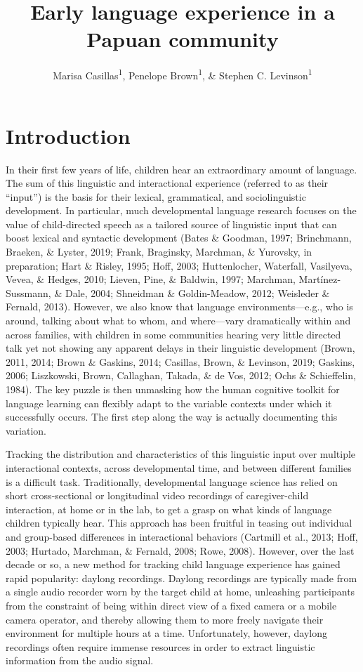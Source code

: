 \documentclass[,man,floatsintext]{apa6}
\title{Early language experience in a Papuan community}
\author{Marisa Casillas\textsuperscript{1}, Penelope Brown\textsuperscript{1},
\& Stephen C. Levinson\textsuperscript{1}}
\date{}
\affiliation{
\vspace{0.5cm}
\textsuperscript{1} Max Planck Institute for Psycholinguistics}
\begin{document}
\maketitle

\section{Introduction}\label{intro}

In their first few years of life, children hear an extraordinary amount
of language. The sum of this linguistic and interactional experience
(referred to as their \enquote{input}) is the basis for their lexical,
grammatical, and sociolinguistic development. In particular, much
developmental language research focuses on the value of child-directed
speech as a tailored source of linguistic input that can boost lexical
and syntactic development (Bates \& Goodman, 1997; Brinchmann, Braeken,
\& Lyster, 2019; Frank, Braginsky, Marchman, \& Yurovsky, in
preparation; Hart \& Risley, 1995; Hoff, 2003; Huttenlocher, Waterfall,
Vasilyeva, Vevea, \& Hedges, 2010; Lieven, Pine, \& Baldwin, 1997;
Marchman, Martínez-Sussmann, \& Dale, 2004; Shneidman \& Goldin-Meadow,
2012; Weisleder \& Fernald, 2013). However, we also know that language
environments---e.g., who is around, talking about what to whom, and
where---vary dramatically within and across families, with children in
some communities hearing very little directed talk yet not showing any
apparent delays in their linguistic development (Brown, 2011, 2014;
Brown \& Gaskins, 2014; Casillas, Brown, \& Levinson, 2019; Gaskins,
2006; Liszkowski, Brown, Callaghan, Takada, \& de Vos, 2012; Ochs \&
Schieffelin, 1984). The key puzzle is then unmasking how the human
cognitive toolkit for language learning can flexibly adapt to the
variable contexts under which it successfully occurs. The first step
along the way is actually documenting this variation.

Tracking the distribution and characteristics of this linguistic input
over multiple interactional contexts, across developmental time, and
between different families is a difficult task. Traditionally,
developmental language science has relied on short cross-sectional or
longitudinal video recordings of caregiver-child interaction, at home or
in the lab, to get a grasp on what kinds of language children typically
hear. This approach has been fruitful in teasing out individual and
group-based differences in interactional behaviors (Cartmill et al.,
2013; Hoff, 2003; Hurtado, Marchman, \& Fernald, 2008; Rowe, 2008).
However, over the last decade or so, a new method for tracking child
language experience has gained rapid popularity: daylong recordings.
Daylong recordings are typically made from a single audio recorder worn
by the target child at home, unleashing participants from the constraint
of being within direct view of a fixed camera or a mobile camera
operator, and thereby allowing them to more freely navigate their
environment for multiple hours at a time. Unfortunately, however,
daylong recordings often require immense resources in order to extract
linguistic information from the audio signal.
\end{document}
